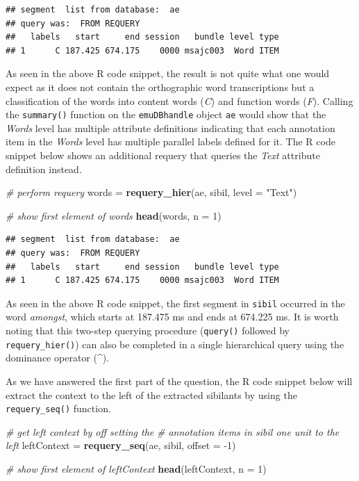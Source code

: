 \documentclass[]{book}
\newenvironment{Shaded}{\begin{snugshade}}{\end{snugshade}}
\newcommand{\CommentTok}[1]{\textcolor[rgb]{0.56,0.35,0.01}{\textit{#1}}}
\newcommand{\DataTypeTok}[1]{\textcolor[rgb]{0.13,0.29,0.53}{#1}}
\newcommand{\DecValTok}[1]{\textcolor[rgb]{0.00,0.00,0.81}{#1}}
\newcommand{\KeywordTok}[1]{\textcolor[rgb]{0.13,0.29,0.53}{\textbf{#1}}}
\newcommand{\NormalTok}[1]{#1}
\newcommand{\StringTok}[1]{\textcolor[rgb]{0.31,0.60,0.02}{#1}}
\begin{document}
\begin{verbatim}
## segment  list from database:  ae 
## query was:  FROM REQUERY 
##   labels   start     end session   bundle level type
## 1      C 187.425 674.175    0000 msajc003  Word ITEM
\end{verbatim}

As seen in the above R code snippet, the result is not quite what one would expect as it does not contain the orthographic word transcriptions but a classification of the words into content words (\emph{C}) and function words (\emph{F}). Calling the \texttt{summary()} function on the \texttt{emuDBhandle} object \texttt{ae} would show that the \emph{Words} level has multiple attribute definitions indicating that each annotation item in the \emph{Words} level has multiple parallel labels defined for it. The R code snippet below shows an additional requery that queries the \emph{Text} attribute definition instead.

\begin{Shaded}
\begin{Highlighting}[]
\CommentTok{# perform requery}
\NormalTok{words =}\StringTok{ }\KeywordTok{requery_hier}\NormalTok{(ae, sibil, }\DataTypeTok{level =} \StringTok{"Text"}\NormalTok{)}

\CommentTok{# show first element of words}
\KeywordTok{head}\NormalTok{(words, }\DataTypeTok{n =} \DecValTok{1}\NormalTok{)}
\end{Highlighting}
\end{Shaded}

\begin{verbatim}
## segment  list from database:  ae 
## query was:  FROM REQUERY 
##   labels   start     end session   bundle level type
## 1      C 187.425 674.175    0000 msajc003  Word ITEM
\end{verbatim}

As seen in the above R code snippet, the first segment in \texttt{sibil} occurred in the word \emph{amongst}, which starts at 187.475 ms and ends at 674.225 ms. It is worth noting that this two-step querying procedure (\texttt{query()} followed by \texttt{requery\_hier()}) can also be completed in a single hierarchical query using the dominance operator (\^{}).

As we have answered the first part of the question, the R code snippet below will extract the context to the left of the extracted sibilants by using the \texttt{requery\_seq()} function.

\begin{Shaded}
\begin{Highlighting}[]
\CommentTok{# get left context by off setting the }
\CommentTok{# annotation items in sibil one unit to the left}
\NormalTok{leftContext =}\StringTok{ }\KeywordTok{requery_seq}\NormalTok{(ae, sibil, }\DataTypeTok{offset =} \DecValTok{-1}\NormalTok{)}

\CommentTok{# show first element of leftContext}
\KeywordTok{head}\NormalTok{(leftContext, }\DataTypeTok{n =} \DecValTok{1}\NormalTok{)}
\end{Highlighting}
\end{Shaded}
\end{document}
